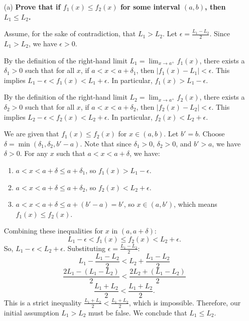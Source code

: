 \documentclass{article}
\begin{document}
\begin{enumerate}
  \item[(a)] \textbf{Prove that if \(f_1(x) \le f_2(x)\) for some interval \((a,b)\), then \(L_1\le L_2\).}

    Assume, for the sake of contradiction, that \(L_1 > L_2\).
    Let \(\epsilon = \frac{L_1 - L_2}{2}\). Since \(L_1 > L_2\), we have \(\epsilon > 0\).

    By the definition of the right-hand limit \(L_1 = \lim_{x\to a^+} f_1(x)\), there exists a \(\delta_1 > 0\) such that for all \(x\), if \(a < x < a + \delta_1\), then \(|f_1(x) - L_1| < \epsilon\). This implies \(L_1 - \epsilon < f_1(x) < L_1 + \epsilon\). In particular, \(f_1(x) > L_1 - \epsilon\).

    By the definition of the right-hand limit \(L_2 = \lim_{x\to a^+} f_2(x)\), there exists a \(\delta_2 > 0\) such that for all \(x\), if \(a < x < a + \delta_2\), then \(|f_2(x) - L_2| < \epsilon\). This implies \(L_2 - \epsilon < f_2(x) < L_2 + \epsilon\). In particular, \(f_2(x) < L_2 + \epsilon\).

    We are given that \(f_1(x) \le f_2(x)\) for \(x \in (a, b)\). Let \(b' = b\).
    Choose \(\delta = \min(\delta_1, \delta_2, b' - a)\). Note that since \(\delta_1 > 0\), \(\delta_2 > 0\), and \(b' > a\), we have \(\delta > 0\).
    For any \(x\) such that \(a < x < a + \delta\), we have:
    \begin{enumerate}
        \item \(a < x < a + \delta \le a + \delta_1\), so \(f_1(x) > L_1 - \epsilon\).
        \item \(a < x < a + \delta \le a + \delta_2\), so \(f_2(x) < L_2 + \epsilon\).
        \item \(a < x < a + \delta \le a + (b' - a) = b'\), so \(x \in (a, b')\), which means \(f_1(x) \le f_2(x)\).
    \end{enumerate}
    Combining these inequalities for \(x\) in \((a, a+\delta)\):
    \[ L_1 - \epsilon < f_1(x) \le f_2(x) < L_2 + \epsilon. \]
    So, \(L_1 - \epsilon < L_2 + \epsilon\).
    Substituting \(\epsilon = \frac{L_1 - L_2}{2}\):
    \[ L_1 - \frac{L_1 - L_2}{2} < L_2 + \frac{L_1 - L_2}{2} \]
    \[ \frac{2L_1 - (L_1 - L_2)}{2} < \frac{2L_2 + (L_1 - L_2)}{2} \]
    \[ \frac{L_1 + L_2}{2} < \frac{L_1 + L_2}{2}. \]
    This is a strict inequality \(\frac{L_1 + L_2}{2} < \frac{L_1 + L_2}{2}\), which is impossible.
    Therefore, our initial assumption \(L_1 > L_2\) must be false.
    We conclude that \(L_1 \le L_2\).


\end{enumerate}
\end{document}
